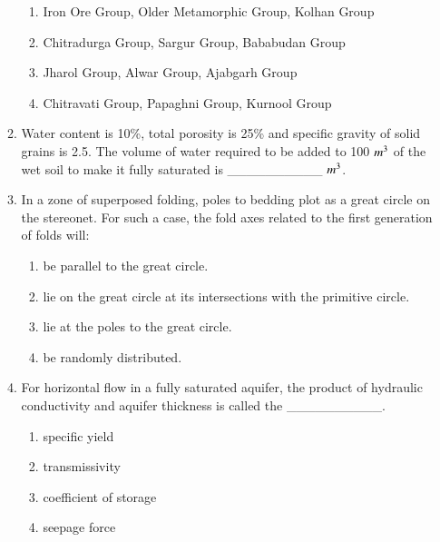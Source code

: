 \documentclass[journal,12pt,onecolumn]{IEEEtran}
\begin{document}
\begin{enumerate}
\begin{enumerate}
\hfill{}


\begin{enumerate}
\item  Iron Ore Group, Older Metamorphic Group, Kolhan Group
\item Chitradurga Group, Sargur Group, Bababudan Group 

\item  Jharol Group, Alwar Group, Ajabgarh Group 
\item  Chitravati Group, Papaghni Group, Kurnool Group 
\end{enumerate}


\item Water content is 10\%, total porosity is 25\% and specific gravity of solid grains is 2.5. The volume of water required to be added to 100 $m\textsuperscript{3}$ of the wet soil to make it fully saturated is __________ $m\textsuperscript{3}$.

\hfill{}


\item In a zone of superposed folding, poles to bedding plot as a great circle on the stereonet. For such a case, the fold axes related to the first generation of folds will:

\hfill{}

\begin{multicols}{2}
\begin{enumerate}
\item be parallel to the great circle.
\item lie on the great circle at its intersections with the primitive circle.
\item lie at the poles to the great circle.
\item be randomly distributed.
\end{enumerate}
\end{multicols}

\item For horizontal flow in a fully saturated aquifer, the product of hydraulic conductivity and aquifer thickness is called the __________.

\hfill{}

\begin{multicols}{2}
\begin{enumerate}
\item specific yield
\item transmissivity
\item coefficient of storage
\item seepage force
\end{enumerate}
\end{multicols}


\end{enumerate}
\end{enumerate}
\end{document}
